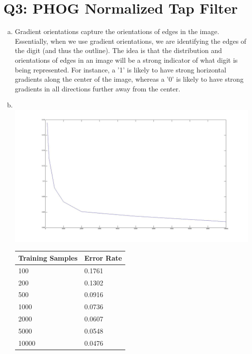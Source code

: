 \documentclass[12pt]{article}
\begin{document}
\newpage
\section*{Q3: PHOG Normalized Tap Filter}
  \begin{enumerate}[a.]
    \item Gradient orientations capture the orientations of edges in the
      image. Essentially, when we use gradient orientations, we are identifying
      the edges of the digit (and thus the outline). The idea is that the
      distribution and orientations of edges in an image will be a strong
      indicator of what digit is being represented. For instance, a '1' is
      likely to have strong horizontal gradients along the center of the image,
      whereas a '0' is likely to have strong gradients in all directions further
      away from the center.
    \item \quad \\
      \includegraphics[scale=0.3]{q3_normalized_tap.jpg}
      \begin{tabular}{l|l}
        \hline
        Training Samples & Error Rate \\
        \hline
        100   & 0.1761 \\
        200   & 0.1302 \\
        500   & 0.0916 \\
        1000  & 0.0736 \\
        2000  & 0.0607 \\
        5000  & 0.0548 \\
        10000 & 0.0476 \\
      \end{tabular}
  \end{enumerate}


\newpage
\end{document}
